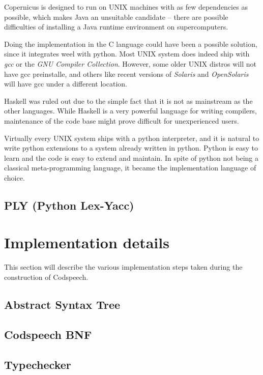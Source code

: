 Copernicus is designed to run on UNIX machines with as few
dependencies as possible, which makes Java an unsuitable candidate --
there are possible difficulties of installing a Java runtime
environment on supercomputers.

Doing the implementation in the C language could have been a possible
solution, since it integrates weel with python. Most UNIX system does
indeed ship with \emph{gcc} or the \emph{GNU Compiler
  Collection}. However, some older UNIX distros will not have gcc
preinstalle, and others like recent versions of \emph{Solaris} and
\emph{OpenSolaris} will have gcc under a different location.

Haskell was ruled out due to the simple fact that it is not as
mainstream as the other languages. While Haskell is a very powerful
language for writing compilers, maintenance of the code base might
prove difficult for unexperienced users.

Virtually every UNIX system ships with a python interpreter, and it is
natural to write python extensions to a system already written in
python. Python is easy to learn and the code is easy to extend and
maintain. In spite of python not being a classical meta-programming
language, it became the implementation language of choice.


\subsection{PLY (Python Lex-Yacc)}\label{sec:ply}



\section{Implementation details}
This section will describe the various implementation steps taken
during the construction of Codspeech.

\subsection{Abstract Syntax Tree}\label{sec:ast}



\subsection{Codspeech BNF}\label{sec:bnf}



\subsection{Typechecker}\label{sec:typechecker}


